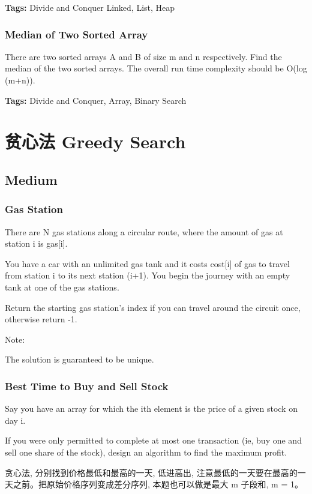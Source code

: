 \documentclass[12pt]{book}
\begin{document}
\textbf{Tags:} Divide and Conquer Linked, List, Heap

\subsection{Median of Two Sorted Array}
\label{sec-12-3-2}
There are two sorted arrays A and B of size m and n respectively. Find the median of the two sorted arrays. The overall run time complexity should be O(log (m+n)).

\textbf{Tags:} Divide and Conquer, Array, Binary Search

\chapter{贫心法 Greedy Search}
\label{sec-13}
\section{Medium}
\label{sec-13-1}
\subsection{Gas Station}
\label{sec-13-1-1}
There are N gas stations along a circular route, where the amount of gas at station i is gas[i].

You have a car with an unlimited gas tank and it costs cost[i] of gas to travel from station i to its next station (i+1). You begin the journey with an empty tank at one of the gas stations.

Return the starting gas station's index if you can travel around the circuit once, otherwise return -1.

Note:

The solution is guaranteed to be unique.

\subsection{Best Time to Buy and Sell Stock}
\label{sec-13-1-2}
Say you have an array for which the ith element is the price of a given stock on day i.

If you were only permitted to complete at most one transaction (ie, buy one and sell one share of the stock), design an algorithm to find the maximum profit.

贪心法, 分别找到价格最低和最高的一天, 低进高出, 注意最低的一天要在最高的一天之前。把原始价格序列变成差分序列, 本题也可以做是最大 m 子段和, m = 1。
\end{document}
